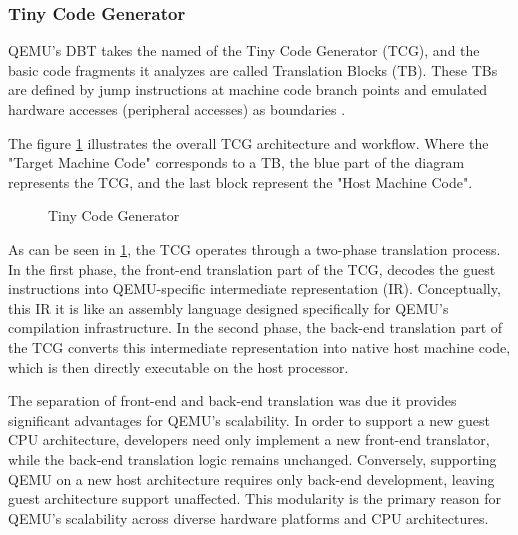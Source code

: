 \subsubsection{Tiny Code Generator}
\label{chap:QEMU_TCG}

QEMU's DBT takes the named of the Tiny Code Generator (TCG), and the basic 
code fragments it analyzes are called Translation Blocks (TB). These TBs are 
defined by jump instructions at machine code branch points and emulated hardware 
accesses (peripheral accesses) as boundaries\cite{QemuTCGOpsDevel} \cite{QemuTCGDirectBlockChaining}. 

The figure \ref{fig:TCG} illustrates the overall TCG architecture and workflow. Where the 
"Target Machine Code" corresponds to a TB, the blue part of the diagram represents 
the TCG, and the last block represent the "Host Machine Code".

\begin{figure}
    \centering
    \caption{Tiny Code Generator}
    \label{fig:TCG}
\end{figure}

As can be seen in \ref{fig:TCG}, the TCG operates through a two-phase translation 
process. In the first phase, the front-end translation part of the TCG, decodes 
the guest instructions into QEMU-specific intermediate representation (IR). 
Conceptually, this IR it is like an assembly language designed specifically for QEMU's 
compilation infrastructure. In the second phase, the back-end translation part of 
the TCG converts this intermediate representation into native host machine code, 
which is then directly executable on the host processor\cite{QemuTCGFrontendOps}\cite{QemuTCGBackendOps}.

The separation of front-end and back-end translation was due it provides 
significant advantages for QEMU's scalability. In order to support a new guest CPU 
architecture, developers need only implement a new front-end translator, while the 
back-end translation logic remains unchanged. Conversely, supporting QEMU on a 
new host architecture requires only back-end development, leaving guest architecture 
support unaffected. This modularity is the primary reason for QEMU's scalability 
across diverse hardware platforms and CPU architectures.